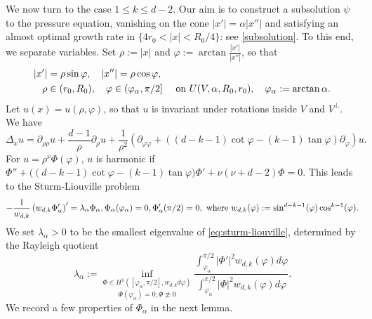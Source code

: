 \documentclass[11pt]{amsart}
\numberwithin{equation}{section}
\numberwithin{figure}{section}
\theoremstyle{plain}
\theoremstyle{definition}
\theoremstyle{remark}
\theoremstyle{plain}
\begin{document}
We now turn to the case $1 \leq k \leq d-2$. Our aim is to construct a subsolution $\psi$ to the pressure equation, vanishing on the cone $|x'|=\alpha |x''|$ and satisfying an almost optimal growth rate in $\{4r_0<|x|<R_0/4\}$: see \eqref{subsolution}. To this end, we separate variables. Set $\rho:=|x|$ and $\varphi:= \arctan \frac{|x'|}{|x''|}$, so that 
\begin{equation}\label{eq:spherical_coordinates}
\begin{aligned}
    |x'| &= \rho\sin\varphi,\quad |x''| = \rho\cos\varphi,& \\
    \rho&\in (r_0, R_0), \quad \varphi\in (\varphi_\alpha, \pi/2] &\hbox{ on } U(V, \alpha, R_0, r_0), \quad \varphi_\alpha:=\arctan\alpha.
\end{aligned}
\end{equation}
Let $u(x) = u(\rho, \varphi)$, so that $u$ is invariant under rotations inside $V$ and $V^\perp$. We have
\begin{equation}\label{eq:cone_laplacian}
    \Delta_x u = \partial_{\rho\rho}u + \frac{d-1}{\rho}\partial_\rho u + \frac{1}{\rho^2}\left(\partial_{\varphi\varphi} + ((d-k-1)\cot\varphi - (k-1)\tan\varphi)\partial_\varphi\right)u.
\end{equation}
 For $u=\rho^{\nu}\Phi(\varphi)$, $u$ is harmonic if $\Phi''+\big((d-k-1)\cot\varphi-(k-1)\tan\varphi\big)\Phi'+\nu(\nu+d-2)\Phi=0$. This leads to the Sturm-Liouville problem
\begin{equation}\label{eq:sturm-liouville}
    -\frac{1}{w_{d,k}}\left(w_{d,k}\Phi'_\alpha\right)' = \lambda_\alpha\Phi_\alpha,  \Phi_\alpha(\varphi_\alpha) = 0, \Phi_\alpha'(\pi/2) = 0,
\hbox{ where } w_{d,k}(\varphi) := \sin^{d-k-1}(\varphi)\cos^{k-1}(\varphi).
\end{equation} We set $\lambda_\alpha > 0$ to be the smallest eigenvalue of \eqref{eq:sturm-liouville}, determined by the Rayleigh quotient
\begin{equation}\label{eq:rayleigh_quotient}
        \lambda_\alpha := \underset{\Phi(\varphi_\alpha) = 0, \Phi\not\equiv0}{\inf_{\Phi\in H^1([\varphi_\alpha,\pi/2], w_{d,k}d\varphi)}}\frac{\int_{\varphi_\alpha}^{\pi/2} |\Phi'|^2w_{d,k}(\varphi)d\varphi}{\int_{\varphi_\alpha}^{\pi/2} |\Phi|^2 w_{d,k}(\varphi)d\varphi}.
\end{equation}
We record a few  properties of $\Phi_{\alpha}$ in the next lemma.
\end{document}
